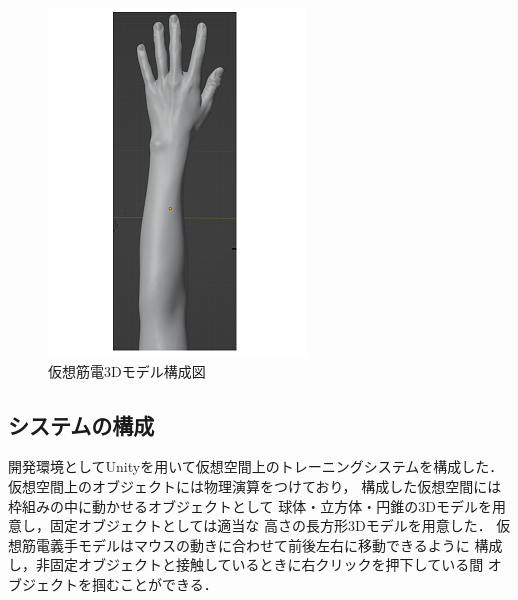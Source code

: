 \documentclass[11pt]{ltjsarticle}
\begin{document}
\begin{figure}[H]
\begin{minipage}{0.28\columnwidth}
		\end{minipage}
		\hspace{0.1\columnwidth}
		\begin{minipage}{0.4\columnwidth}
		\centering
		\includegraphics[width = \columnwidth]{figs/handmesh_rear2.png}
		\end{minipage}
		\caption{仮想筋電3Dモデル構成図}
		\label{fig:VRhand}
		\end{figure}

	\subsection{システムの構成}
		開発環境としてUnityを用いて仮想空間上のトレーニングシステムを構成した．
		仮想空間上のオブジェクトには物理演算をつけており，
		構成した仮想空間には枠組みの中に動かせるオブジェクトとして
		球体・立方体・円錐の3Dモデルを用意し，固定オブジェクトとしては適当な
		高さの長方形3Dモデルを用意した．
		仮想筋電義手モデルはマウスの動きに合わせて前後左右に移動できるように
		構成し，非固定オブジェクトと接触しているときに右クリックを押下している間
		オブジェクトを掴むことができる．
\end{document}
